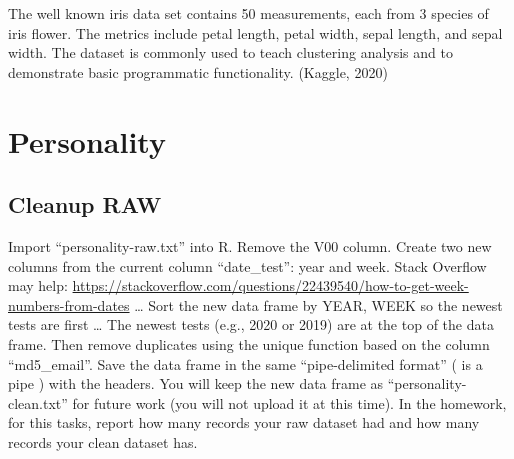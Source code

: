 \documentclass[
]{article}
\begin{document}
The well known iris data set contains 50 measurements, each from 3
species of iris flower. The metrics include petal length, petal width,
sepal length, and sepal width. The dataset is commonly used to teach
clustering analysis and to demonstrate basic programmatic functionality.
(Kaggle, 2020)

\hypertarget{personality}{%
\section{Personality}\label{personality}}

\hypertarget{cleanup-raw}{%
\subsection{Cleanup RAW}\label{cleanup-raw}}

Import ``personality-raw.txt'' into R. Remove the V00 column. Create two
new columns from the current column ``date\_test'': year and week. Stack
Overflow may help:
\url{https://stackoverflow.com/questions/22439540/how-to-get-week-numbers-from-dates}
\ldots{} Sort the new data frame by YEAR, WEEK so the newest tests are
first \ldots{} The newest tests (e.g., 2020 or 2019) are at the top of
the data frame. Then remove duplicates using the unique function based
on the column ``md5\_email''. Save the data frame in the same
``pipe-delimited format'' ( \textbar{} is a pipe ) with the headers. You
will keep the new data frame as ``personality-clean.txt'' for future
work (you will not upload it at this time). In the homework, for this
tasks, report how many records your raw dataset had and how many records
your clean dataset has.
\end{document}
